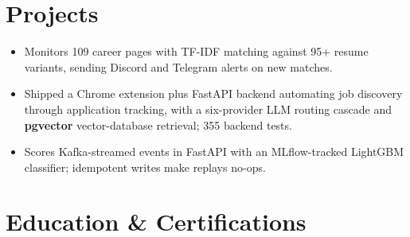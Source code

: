 \documentclass[letterpaper,10pt]{article}
\begin{document}
\section{Projects}
\begin{itemize}
\item Monitors 109 career pages with TF-IDF matching against 95+ resume variants, sending Discord and Telegram alerts on new matches.
\end{itemize}
\begin{itemize}
\item Shipped a Chrome extension plus FastAPI backend automating job discovery through application tracking, with a six-provider LLM routing cascade and \textbf{pgvector} vector-database retrieval; 355 backend tests.
\end{itemize}
\begin{itemize}
\item Scores Kafka-streamed events in FastAPI with an MLflow-tracked LightGBM classifier; idempotent writes make replays no-ops.
\end{itemize}

\section{Education \& Certifications}
\end{document}
